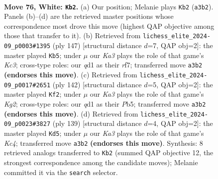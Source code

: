 \documentclass[11pt]{article}
\begin{document}
\clearpage

\begin{figure}[p]\centering
\begin{subfigure}{0.46\textwidth}\centering
\resizebox{\linewidth}{!}{%
\newchessgame
\chessboard[
  setfen={8/8/1p6/p5k1/2P5/K7/8/3q4 w - - 8 76},
  showmover=false,
  pgfstyle=straightmove, color=movearrow, markmove={a3-b2}
]}
\caption{}
\end{subfigure}\hfill
\begin{subfigure}{0.46\textwidth}\centering
\resizebox{\linewidth}{!}{%
\newchessgame
\chessboard[
  setfen={8/5R2/p1k5/P7/1P6/6r1/K7/8 b - - 2 74},
  showmover=false,
  pgfstyle=straightmove, color=movearrow, markmove={c6-b5}
]}
\caption{}
\end{subfigure}
\\[4pt]
\begin{subfigure}{0.46\textwidth}\centering
\resizebox{\linewidth}{!}{%
\newchessgame
\chessboard[
  setfen={8/8/1p6/1P4p1/5pP1/3k4/6K1/8 w - - 4 72},
  showmover=false,
  pgfstyle=straightmove, color=movearrow, markmove={g2-f2}
]}
\caption{}
\end{subfigure}\hfill
\begin{subfigure}{0.46\textwidth}\centering
\resizebox{\linewidth}{!}{%
\newchessgame
\chessboard[
  setfen={8/8/8/p1k5/P7/1P1K4/8/8 b - - 6 70},
  showmover=false,
  pgfstyle=straightmove, color=movearrow, markmove={c5-d5}
]}
\caption{}
\end{subfigure}
\caption{\textbf{Move 76, White: \texttt{Kb2}.} (a) Our position; Melanie plays \texttt{Kb2} (\texttt{a3b2}). Panels (b)--(d) are the retrieved master positions whose correspondence most drove this move (highest QAP objective among those that transfer to it). (b) Retrieved from \texttt{lichess\_elite\_2024-09\_p0003\#1395} (ply 147) [structural distance $d$=7, QAP obj=2]: the master played \texttt{Kb5}; under $\mu$ our \emph{Ka3} plays the role of that game's \emph{Kc3}; cross-type roles: our \emph{q}d1 as their \emph{r}f7; transferred move \texttt{a3b2} \textbf{(endorses this move)}. (c) Retrieved from \texttt{lichess\_elite\_2024-09\_p0017\#2651} (ply 142) [structural distance $d$=5, QAP obj=2]: the master played \texttt{Kf2}; under $\mu$ our \emph{Ka3} plays the role of that game's \emph{Kg2}; cross-type roles: our \emph{q}d1 as their \emph{P}b5; transferred move \texttt{a3b2} \textbf{(endorses this move)}. (d) Retrieved from \texttt{lichess\_elite\_2024-09\_p0023\#3827} (ply 139) [structural distance $d$=4, QAP obj=2]: the master played \texttt{Kd5}; under $\mu$ our \emph{Ka3} plays the role of that game's \emph{Kc4}; transferred move \texttt{a3b2} \textbf{(endorses this move)}. Synthesis: 8 retrieved analogs transferred to \texttt{Kb2} (summed QAP objective 12, the strongest correspondence among the candidate moves); Melanie committed it via the \texttt{search} selector.}
\label{fig:thought-m150}
\end{figure}
\end{document}
